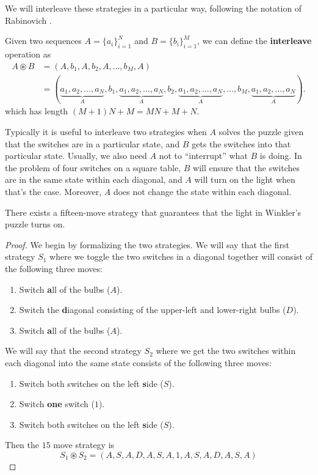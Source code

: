 We will interleave these strategies in a particular way, following the notation
of Rabinovich \cite{Rabinovich2022}.

\begin{definition}
  Given two sequences $A = \{a_i\}_{i=1}^N$ and $B = \{b_i\}_{i=1}^M$, we can
  define the \textbf{interleave} operation as \begin{align}
    A \circledast B &= (A,b_1,A,b_2,A,\dots,b_M,A) \\
      &= (
      \underbrace{a_1, a_2, \dots, a_N}_A,
      b_1,
      \underbrace{a_1, a_2, \dots, a_N}_A,
      b_2,
      \underbrace{a_1, a_2, \dots, a_N}_A,
      \dots,
      b_M,
      \underbrace{a_1, a_2, \dots, a_N}_A).
  \end{align} which has length $(M+1)N + M = MN + M + N$.
\end{definition}

Typically it is useful to interleave two strategies when
$A$ solves the puzzle given that the switches are in a particular state, and
$B$ gets the switches into that particular state.
Usually, we also need $A$ not to ``interrupt'' what $B$ is doing.
In the problem of four switches on a square table,
$B$ will ensure that the switches are in the same state within each diagonal,
and $A$ will turn on the light when that's the case.
Moreover, $A$ does not change the state within each diagonal.

\begin{proposition}
  There exists a fifteen-move strategy that guarantees that the light in
  Winkler's puzzle turns on.
\end{proposition}
\begin{proof}
  We begin by formalizing the two strategies. We will say that the first
  strategy $S_1$ where we toggle the two switches in a diagonal together
  will consist of the following three moves: \begin{enumerate}
    \item Switch \textbf{a}ll of the bulbs ($A$).
    \item Switch the \textbf{d}iagonal consisting of the upper-left and lower-right bulbs ($D$).
    \item Switch \textbf{a}ll of the bulbs ($A$).
  \end{enumerate}
  We will say that the second strategy $S_2$ where we get the two switches
  within each diagonal into the same state consists of the following three
  moves: \begin{enumerate}
    \item Switch both switches on the left \textbf{s}ide ($S$).
    \item Switch \textbf{one} switch ($1$).
    \item Switch both switches on the left \textbf{s}ide ($S$).
  \end{enumerate}
  Then the $15$ move strategy is \[
    S_1 \circledast S_2 = (A, S, A, D, A, S, A, 1, A, S, A, D, A, S, A)
  \]
\end{proof}

